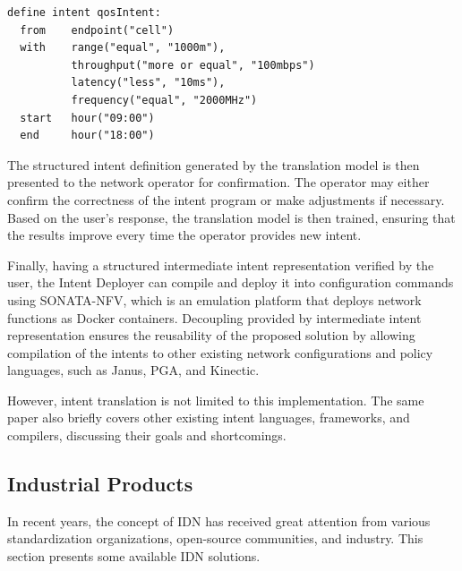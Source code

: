 \begin{lstlisting}[language=Nile,float=ht,caption={Nile intent example. \cite{Jacobs2018} },label=lst:nile_intent_example]
define intent qosIntent:
  from    endpoint("cell")
  with    range("equal", "1000m"),
          throughput("more or equal", "100mbps")
          latency("less", "10ms"),
          frequency("equal", "2000MHz")
  start   hour("09:00")
  end     hour("18:00")
\end{lstlisting}

The structured intent definition generated by the translation model is then presented to the network operator for confirmation. The operator may either confirm the correctness of the intent program or make adjustments if necessary. Based on the user’s response, the translation model is then trained, ensuring that the results improve every time the operator provides new intent.

Finally, having a structured intermediate intent representation verified by the user, the Intent Deployer can compile and deploy it into configuration commands using SONATA-NFV, which is an emulation platform that deploys network functions as Docker containers. Decoupling provided by intermediate intent representation ensures the reusability of the proposed solution by allowing compilation of the intents to other existing network configurations and policy languages, such as Janus, PGA, and Kinectic.

However, intent translation is not limited to this implementation. The same paper \cite[20]{Jacobs2018} also briefly covers other existing intent languages, frameworks, and compilers, discussing their goals and shortcomings.
	

\subsection{Industrial Products}

In recent years, the concept of IDN has received great attention from various standardization organizations, open-source communities, and industry. This section presents some available IDN solutions.

